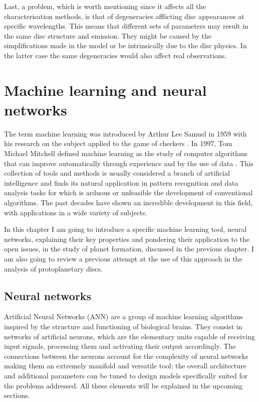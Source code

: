 \documentclass[a4paper,10pt]{report}
\begin{document}
Last, a problem, which is worth mentioning since it affects all the characterisation methods,
is that of degeneracies afflicting disc appearances at specific
wavelengths. This means that different sets of parameters may result in the same disc structure and emission.
They might be caused by the simplifications made in the model or be intrinsically due to the disc physics. 
In the latter case the same degeneracies would also affect real observations.

\chapter{Machine learning and neural networks}

The term machine learning was introduced by Arthur Lee Samuel in 1959
with his research on the subject applied to the game of checkers \cite{ml_checkers}.
In 1997, Tom Michael Mitchell defined machine learning as the study of
computer algorithms that can improve automatically through experience and by the use of data \cite{book_ml}.
This collection of tools and methods is usually considered a branch of artificial intelligence and 
finds its natural application in pattern recognition and data analysis tasks for which is arduous or
unfeasible the development of conventional algorithms.
The past decades have shown an incredible development in this field,
with applications in a wide variety of subjects.

In this chapter I am going to introduce a specific machine learning tool, neural networks, explaining
their key properties and pondering their application to the open issues, in the study of planet formation,
discussed in the previous chapter. I am also going to review a previous attempt at the use of this approach in the 
analysis of protoplanetary discs.

\section{Neural networks}

Artificial Neural Networks (ANN) are a group of machine learning algorithms inspired by the structure and functioning 
of biological brains.
They consist in networks of artificial neurons,
which are the elementary units capable of receiving input signals, processing
them and activating their output accordingly. The connections between the neurons account for 
the complexity of neural networks making them an extremely manifold and versatile tool:
the overall architecture and additional parameters can be tuned to design 
models specifically suited for the problems addressed.
All these elements will be explained in the upcoming sections.
\end{document}
